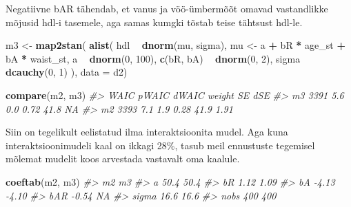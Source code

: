 \documentclass[]{book}
\newenvironment{Shaded}{\begin{snugshade}}{\end{snugshade}}
\newcommand{\CommentTok}[1]{\textcolor[rgb]{0.56,0.35,0.01}{\textit{#1}}}
\newcommand{\DataTypeTok}[1]{\textcolor[rgb]{0.13,0.29,0.53}{#1}}
\newcommand{\DecValTok}[1]{\textcolor[rgb]{0.00,0.00,0.81}{#1}}
\newcommand{\KeywordTok}[1]{\textcolor[rgb]{0.13,0.29,0.53}{\textbf{#1}}}
\newcommand{\NormalTok}[1]{#1}
\newcommand{\OperatorTok}[1]{\textcolor[rgb]{0.81,0.36,0.00}{\textbf{#1}}}
\newcommand{\StringTok}[1]{\textcolor[rgb]{0.31,0.60,0.02}{#1}}
\begin{document}
Negatiivne bAR tähendab, et vanus ja vöö-ümbermõõt omavad vastandlikke mõjusid hdl-i tasemele, aga samas kumgki tõstab teise tähtsust hdl-le.

\begin{Shaded}
\begin{Highlighting}[]
\NormalTok{m3 <-}\StringTok{ }\KeywordTok{map2stan}\NormalTok{(}
    \KeywordTok{alist}\NormalTok{(}
\NormalTok{        hdl }\OperatorTok{~}\StringTok{ }\KeywordTok{dnorm}\NormalTok{(mu, sigma),}
\NormalTok{        mu <-}\StringTok{ }\NormalTok{a }\OperatorTok{+}\StringTok{ }\NormalTok{bR }\OperatorTok{*}\StringTok{ }\NormalTok{age_st }\OperatorTok{+}\StringTok{ }\NormalTok{bA }\OperatorTok{*}\StringTok{ }\NormalTok{waist_st,}
\NormalTok{        a }\OperatorTok{~}\StringTok{ }\KeywordTok{dnorm}\NormalTok{(}\DecValTok{0}\NormalTok{, }\DecValTok{100}\NormalTok{),}
        \KeywordTok{c}\NormalTok{(bR, bA) }\OperatorTok{~}\StringTok{ }\KeywordTok{dnorm}\NormalTok{(}\DecValTok{0}\NormalTok{, }\DecValTok{2}\NormalTok{),}
\NormalTok{        sigma }\OperatorTok{~}\StringTok{ }\KeywordTok{dcauchy}\NormalTok{(}\DecValTok{0}\NormalTok{, }\DecValTok{1}\NormalTok{)}
\NormalTok{), }\DataTypeTok{data =}\NormalTok{ d2)}
\end{Highlighting}
\end{Shaded}

\begin{Shaded}
\begin{Highlighting}[]
\KeywordTok{compare}\NormalTok{(m2, m3)}
\CommentTok{#>    WAIC pWAIC dWAIC weight   SE  dSE}
\CommentTok{#> m3 3391   5.6   0.0   0.72 41.8   NA}
\CommentTok{#> m2 3393   7.1   1.9   0.28 41.9 1.91}
\end{Highlighting}
\end{Shaded}

Siin on tegelikult eelistatud ilma interaktsioonita mudel. Aga kuna interaktsioonimudeli kaal on ikkagi 28\%, tasub meil ennustuste tegemisel mõlemat mudelit koos arvestada vastavalt oma kaalule.

\begin{Shaded}
\begin{Highlighting}[]
\KeywordTok{coeftab}\NormalTok{(m2, m3)}
\CommentTok{#>       m2      m3     }
\CommentTok{#> a        50.4    50.4}
\CommentTok{#> bR       1.12    1.09}
\CommentTok{#> bA      -4.13   -4.10}
\CommentTok{#> bAR     -0.54      NA}
\CommentTok{#> sigma    16.6    16.6}
\CommentTok{#> nobs      400     400}
\end{Highlighting}
\end{Shaded}
\end{document}
